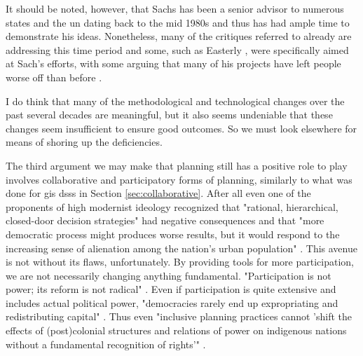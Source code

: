 It should be noted, however, that Sachs has been a senior advisor to numerous states and the \ac{un} dating back to the mid 1980s and thus has had ample time to demonstrate his ideas. Nonetheless, many of the critiques referred to already are addressing this time period and some, such as Easterly \cite{easterlyWhiteManBurden2007a}, were specifically aimed at Sach's efforts, with some arguing that many of his projects have left people worse off than before \cite{munkIdealistJeffreySachs2014}.

I do think that many of the methodological and technological changes over the past several decades are meaningful, but it also seems undeniable that these changes seem insufficient to ensure good outcomes. So we must look elsewhere for means of shoring up the deficiencies.

The third argument we may make that planning still has a positive role to play involves collaborative and participatory forms of planning, similarly to what was done for \ac{gis} \acp{dss} in Section \ref{sec:collaborative}. After all even one of the proponents of high modernist ideology recognized that "rational, hierarchical, closed-door decision strategies" had negative consequences and that "more democratic process might produces worse results, but it would respond to the increasing sense of alienation among the nation's urban population" \cite{lightWarfareWelfareDefense2005}. This avenue is not without its flaws, unfortunately. By providing tools for more participation, we are not necessarily changing anything fundamental. "Participation is not power; its reform is not radical" \cite{marcuseThreeHistoricCurrents2016}. Even if participation is quite extensive and includes actual political power, "democracies rarely end up expropriating and redistributing capital" \cite{fainsteinSpatialJusticePlanning2016}. Thus even "inclusive planning practices cannot 'shift the effects of (post)colonial structures and relations of power on indigenous nations without a fundamental recognition of rights'" \cite{sandercockCommentaryIndigenousPlanning2004}.

